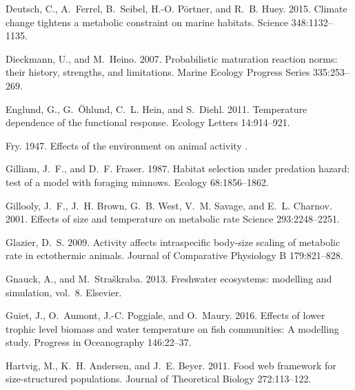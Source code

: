 \documentclass[11pt]{article}\usepackage[]{graphicx}\usepackage[]{color,soul}
\begin{document}
\begin{thebibliography}{55}
Deutsch, C., A.~Ferrel, B.~Seibel, H.-O. Pörtner, and R.~B. Huey. 2015.
\newblock Climate change tightens a metabolic constraint on marine habitats.
\newblock Science 348:1132--1135.

Dieckmann, U., and M.~Heino. 2007.
\newblock Probabilistic maturation reaction norms: their history, strengths,
  and limitations.
\newblock Marine Ecology Progress Series 335:253--269.

Englund, G., G.~Öhlund, C.~L. Hein, and S.~Diehl. 2011.
\newblock Temperature dependence of the functional response.
\newblock Ecology Letters 14:914--921.

Fry. 1947.
\newblock Effects of the environment on animal activity .

Gilliam, J.~F., and D.~F. Fraser. 1987.
\newblock Habitat selection under predation hazard: test of a model with
  foraging minnows.
\newblock Ecology 68:1856--1862.

Gillooly, J.~F., J.~H. Brown, G.~B. West, V.~M. Savage, and E.~L. Charnov. 2001.
\newblock Effects of size and temperature on metabolic rate 
\newblock Science 293:2248--2251.

Glazier, D.~S. 2009.
\newblock Activity affects intraspecific body-size scaling of metabolic rate in
  ectothermic animals.
\newblock Journal of Comparative Physiology B 179:821--828.

Gnauck, A., and M.~Stra{\v{s}}kraba. 2013.
\newblock Freshwater ecosystems: modelling and simulation, vol.~8.
\newblock Elsevier.

Guiet, J., O.~Aumont, J.-C. Poggiale, and O.~Maury. 2016.
\newblock Effects of lower trophic level biomass and water temperature on fish
  communities: A modelling study.
\newblock Progress in Oceanography 146:22--37.

Hartvig, M., K.~H. Andersen, and J.~E. Beyer. 2011.
\newblock Food web framework for size-structured populations.
\newblock Journal of Theoretical Biology 272:113--122.


\end{thebibliography}
\end{document}

